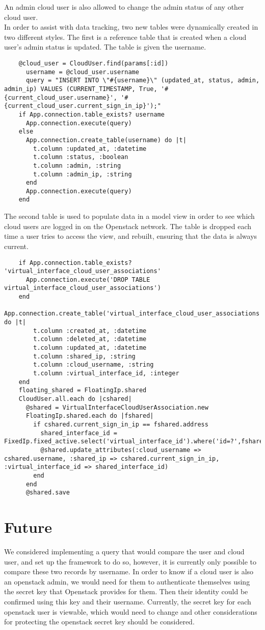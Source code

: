 \documentclass[12pt]{article}
\begin{document}
An admin cloud user is also allowed to change the admin status of any other cloud user.\\
In order to assist with data tracking, two new tables were dynamically created in two different styles. The first is a reference table that is created when a cloud user's admin status is updated. The table is given the username.
\begin{lstlisting}
    @cloud_user = CloudUser.find(params[:id])
      username = @cloud_user.username
      query = "INSERT INTO \"#{username}\" (updated_at, status, admin, admin_ip) VALUES (CURRENT_TIMESTAMP, True, '#{current_cloud_user.username}', '#{current_cloud_user.current_sign_in_ip}');"
    if App.connection.table_exists? username
      App.connection.execute(query)
    else
      App.connection.create_table(username) do |t|
        t.column :updated_at, :datetime
        t.column :status, :boolean
        t.column :admin, :string
        t.column :admin_ip, :string
      end
      App.connection.execute(query)
    end
\end{lstlisting}
The second table is used to populate data in a model view in order to see which cloud users are logged in on the Openstack network. The table is dropped each time a user tries to access the view, and rebuilt, ensuring that the data is always current.
\begin{lstlisting}
    if App.connection.table_exists? 'virtual_interface_cloud_user_associations'
      App.connection.execute('DROP TABLE virtual_interface_cloud_user_associations')
    end
    App.connection.create_table('virtual_interface_cloud_user_associations') do |t|
        t.column :created_at, :datetime
        t.column :deleted_at, :datetime
        t.column :updated_at, :datetime
        t.column :shared_ip, :string
        t.column :cloud_username, :string
        t.column :virtual_interface_id, :integer
    end
    floating_shared = FloatingIp.shared
    CloudUser.all.each do |cshared|
      @shared = VirtualInterfaceCloudUserAssociation.new
      FloatingIp.shared.each do |fshared|
        if cshared.current_sign_in_ip == fshared.address
          shared_interface_id = FixedIp.fixed_active.select('virtual_interface_id').where('id=?',fshared.fixed_ip_id)
          @shared.update_attributes(:cloud_username => cshared.username, :shared_ip => cshared.current_sign_in_ip, :virtual_interface_id => shared_interface_id)
        end
      end
      @shared.save
\end{lstlisting}



\section{Future}
We considered implementing a query that would compare the user and cloud user, and set up the framework to do so, however, it is currently only possible to compare these two records by username. In order to know if a cloud user is also an openstack admin, we would need for them to authenticate themselves using the secret key that Openstack provides for them. Then their identity could be confirmed using this key and their username. Currently, the secret key for each openstack user is viewable, which would need to change and other considerations for protecting the openstack secret key should be considered.
\end{document}
